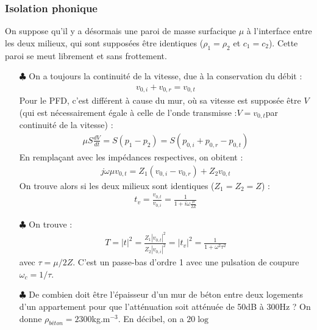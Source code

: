 \documentclass{report}
\begin{document}
\subsubsection*{Isolation phonique}

On suppose qu'il y a désormais une paroi de masse surfacique $\mu$ à l'interface entre les deux milieux, qui sont supposées être identiques ($\rho_1=\rho_2$ et $c_1=c_2$). Cette paroi se meut librement et sans frottement. 

\begin{itemize}
	
	\item[$\clubsuit$] On a toujours la continuité de la vitesse, due à la conservation du débit :
	\begin{align*}
		v_{0,i}+v_{0,r}=v_{0,t}
	\end{align*}
	Pour le PFD, c'est différent à cause du mur, où sa vitesse est supposée être $V$ (qui est nécessairement égale à celle de l'onde transmisse :$V=v_{0,t}$par continuité de la vitesse) :
	\begin{align*}
		\mu S\frac{dV}{dt}=S(p_1-p_2)=S(p_{0,i}+p_{0,r}-p_{0,t})
	\end{align*}
	En remplaçant avec les impédances respectives, on obitent :
	\begin{align*}
		j\omega\mu v_{0,t}=Z_1(v_{0,i}-v_{0,r})+Z_2v_{0,t}
	\end{align*}
	On trouve alors si les deux milieux sont identiques ($Z_1=Z_2=Z$) :
	\begin{align*}
		t_v= \frac{v_{0,t}}{v_{0,i}}= \frac{1}{1+i\omega\frac{\mu}{2Z}}
	\end{align*}
	
	\item[$\clubsuit$] On trouve :
	\begin{align*}
		T= |t|^2=\frac{Z_1|v_{0,t}|^2}{Z_2|v_{0,i}|^2}=|t_v|^2=\frac{1}{1+\omega^2\tau^2}
	\end{align*}
	avec $\tau=\mu/2Z$. C'est un passe-bas d'ordre 1 avec une pulsation de coupure $\omega_c=1/\tau$.
	
	\item[$\clubsuit$] De combien doit être l'épaisseur d'un mur de béton entre deux logements d'un appartement pour que l'atténuation soit atténuée de 50dB à 300Hz ? On donne $\rho_{béton}=2300$kg.m$^{-3}$. 
	En décibel, on a $20\log$ 
	
\end{itemize}
\end{document}
